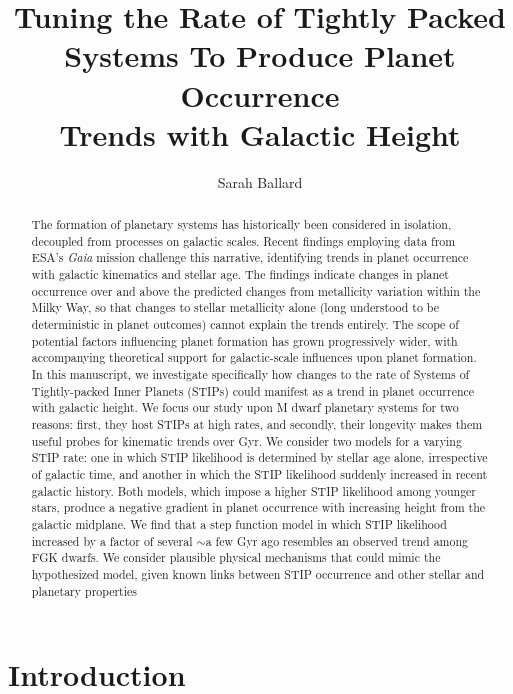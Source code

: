 \documentclass[twocolumn]{aastex631}
\begin{document}
\title{Tuning the Rate of Tightly Packed Systems To Produce Planet Occurrence\\ Trends with Galactic Height}

\author{Sarah Ballard}

\begin{abstract}
The formation of planetary systems has historically been considered in isolation, decoupled from processes on galactic scales. Recent findings employing data from ESA's \textit{Gaia} mission challenge this narrative, identifying trends in planet occurrence with galactic kinematics and stellar age. The findings indicate changes in planet occurrence over and above the predicted changes from metallicity variation within the Milky Way, so that changes to stellar metallicity alone (long understood to be deterministic in planet outcomes) cannot explain the trends entirely. The scope of potential factors influencing planet formation has grown progressively wider, with accompanying theoretical support for galactic-scale influences upon planet formation. In this manuscript, we investigate specifically how changes to the rate of Systems of Tightly-packed Inner Planets (STIPs) could manifest as a trend in planet occurrence with galactic height. We focus our study upon M dwarf planetary systems for two reasons: first, they host STIPs at high rates, and secondly, their longevity makes them useful probes for kinematic trends over Gyr. We consider two models for a varying STIP rate: one in which STIP likelihood is determined by stellar age alone, irrespective of galactic time, and another in which the STIP likelihood suddenly increased in recent galactic history. Both models, which impose a higher STIP likelihood among younger stars, produce a negative gradient in planet occurrence with increasing height from the galactic midplane. We find that a step function model in which STIP likelihood increased by a factor of several $\sim$a few Gyr ago resembles an observed trend among FGK dwarfs. We consider plausible physical mechanisms that could mimic the hypothesized model, given known links between STIP occurrence and other stellar and planetary properties
\end{abstract}


\section{Introduction}
\end{document}
